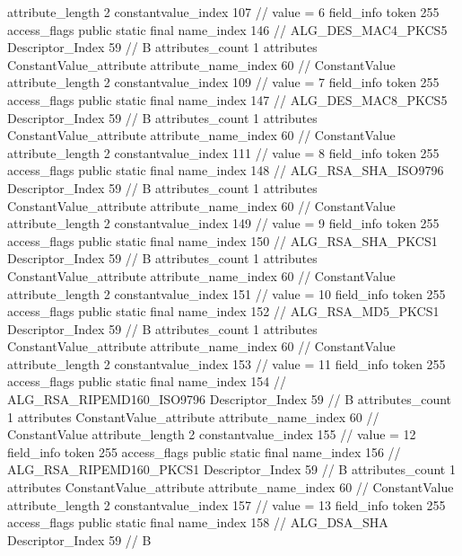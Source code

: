 {{{{{{{					attribute_length	2
					constantvalue_index	107		// value = 6
				}
				}
			}
			field_info {
				token	255
				access_flags	public static final
				name_index	146		// ALG_DES_MAC4_PKCS5
				Descriptor_Index	59		// B
				attributes_count	1
				attributes {
				ConstantValue_attribute {
					attribute_name_index	60		// ConstantValue
					attribute_length	2
					constantvalue_index	109		// value = 7
				}
				}
			}
			field_info {
				token	255
				access_flags	public static final
				name_index	147		// ALG_DES_MAC8_PKCS5
				Descriptor_Index	59		// B
				attributes_count	1
				attributes {
				ConstantValue_attribute {
					attribute_name_index	60		// ConstantValue
					attribute_length	2
					constantvalue_index	111		// value = 8
				}
				}
			}
			field_info {
				token	255
				access_flags	public static final
				name_index	148		// ALG_RSA_SHA_ISO9796
				Descriptor_Index	59		// B
				attributes_count	1
				attributes {
				ConstantValue_attribute {
					attribute_name_index	60		// ConstantValue
					attribute_length	2
					constantvalue_index	149		// value = 9
				}
				}
			}
			field_info {
				token	255
				access_flags	public static final
				name_index	150		// ALG_RSA_SHA_PKCS1
				Descriptor_Index	59		// B
				attributes_count	1
				attributes {
				ConstantValue_attribute {
					attribute_name_index	60		// ConstantValue
					attribute_length	2
					constantvalue_index	151		// value = 10
				}
				}
			}
			field_info {
				token	255
				access_flags	public static final
				name_index	152		// ALG_RSA_MD5_PKCS1
				Descriptor_Index	59		// B
				attributes_count	1
				attributes {
				ConstantValue_attribute {
					attribute_name_index	60		// ConstantValue
					attribute_length	2
					constantvalue_index	153		// value = 11
				}
				}
			}
			field_info {
				token	255
				access_flags	public static final
				name_index	154		// ALG_RSA_RIPEMD160_ISO9796
				Descriptor_Index	59		// B
				attributes_count	1
				attributes {
				ConstantValue_attribute {
					attribute_name_index	60		// ConstantValue
					attribute_length	2
					constantvalue_index	155		// value = 12
				}
				}
			}
			field_info {
				token	255
				access_flags	public static final
				name_index	156		// ALG_RSA_RIPEMD160_PKCS1
				Descriptor_Index	59		// B
				attributes_count	1
				attributes {
				ConstantValue_attribute {
					attribute_name_index	60		// ConstantValue
					attribute_length	2
					constantvalue_index	157		// value = 13
				}
				}
			}
			field_info {
				token	255
				access_flags	public static final
				name_index	158		// ALG_DSA_SHA
				Descriptor_Index	59		// B
}}}}}
